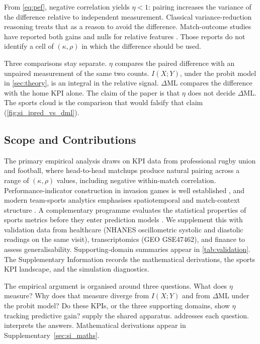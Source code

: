 From \eqref{eq:pef}, negative correlation yields $\eta<1$: pairing increases the variance of the difference relative to independent measurement. Classical variance-reduction reasoning treats that as a reason to avoid the difference. Match-outcome studies have reported both gains and nulls for relative features \parencite{bennett2019descriptive,scott2023urc,mosey2020}. Those reports do not identify a cell of $(\kappa,\rho)$ in which the difference should be used.

Three comparisons stay separate. $\eta$ compares the paired difference with an unpaired measurement of the same two counts. $I(X;Y)$, under the probit model in \cref{sec:theory}, is an integral in the relative signal. $\Delta\mathrm{ML}$ compares the difference with the home KPI alone. The claim of the paper is that $\eta$ does not decide $\Delta\mathrm{ML}$. The sports cloud is the comparison that would falsify that claim (\cref{fig:si_ipred_vs_dml}).

\subsection{Scope and Contributions}
\label{sec:contributions}

The primary empirical analysis draws on KPI data from professional rugby union and football, where head-to-head matchups produce natural pairing across a range of $(\kappa,\rho)$ values, including negative within-match correlation. Performance-indicator construction in invasion games is well established \parencite{hughes2002}, and modern team-sports analytics emphasises spatiotemporal and match-context structure \parencite{bornn2021}. A complementary programme evaluates the statistical properties of sports metrics before they enter prediction models \parencite{franks2016,matteo2026}. We supplement this with validation data from healthcare ({NHANES} oscillometric systolic and diastolic readings on the same visit), transcriptomics ({GEO} {GSE47462}), and finance to assess generalisability. Supporting-domain summaries appear in \cref{tab:validation}. The Supplementary Information records the mathematical derivations, the sports KPI landscape, and the simulation diagnostics.

The empirical argument is organised around three questions. What does $\eta$ measure? Why does that measure diverge from $I(X;Y)$ and from $\Delta\mathrm{ML}$ under the probit model? Do these KPIs, or the three supporting domains, show $\eta$ tracking predictive gain?  supply the shared apparatus.  addresses each question.  interprets the answers. Mathematical derivations appear in Supplementary~\cref{sec:si_maths}.

